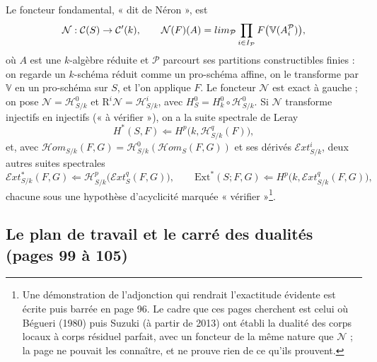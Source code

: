 \documentclass[11pt,a4paper]{article}
\begin{document}
Le foncteur fondamental, « dit de Néron », est
\[
\mathcal{N} : \mathcal{C}(S) \to \mathcal{C}'(k),
\qquad
\mathcal{N}(F)(A) = \varinjlim_{\mathcal{P}} \prod_{i \in I_{\mathcal{P}}}
F\bigl(\mathbb{V}(A^{\mathcal{P}}_i)\bigr),
\]
où $A$ est une $k$-algèbre réduite et $\mathcal{P}$ parcourt ses partitions
constructibles finies : on regarde un $k$-schéma réduit comme un pro-schéma
affine, on le transforme par $\mathbb{V}$ en un pro-schéma sur $S$, et l'on applique
$F$. Le foncteur $\mathcal{N}$ est exact à gauche ; on pose $\mathcal{N} =
\mathcal{H}^0_{S/k}$ et $\mathrm{R}^i\mathcal{N} = \mathcal{H}^i_{S/k}$, avec
$H^0_S = H^0_k \circ \mathcal{H}^0_{S/k}$. Si $\mathcal{N}$ transforme injectifs en
injectifs (« à vérifier »), on a la suite spectrale de Leray
\[
H^{*}(S, F) \Longleftarrow H^p\bigl(k, \mathcal{H}^q_{S/k}(F)\bigr),
\]
et, avec $\mathcal{H}om_{S/k}(F, G) = \mathcal{H}^0_{S/k}(\mathcal{H}om_S(F, G))$ et
ses dérivés $\mathcal{E}xt^i_{S/k}$, deux autres suites spectrales
\[
\mathcal{E}xt^{*}_{S/k}(F, G) \Longleftarrow \mathcal{H}^p_{S/k}\bigl(\mathcal{E}xt^q_S(F,
G)\bigr),
\qquad
\mathrm{Ext}^{*}(S; F, G) \Longleftarrow H^p\bigl(k, \mathcal{E}xt^q_{S/k}(F, G)\bigr),
\]
chacune sous une hypothèse d'acyclicité marquée « vérifier »\footnote{Une
démonstration de l'adjonction qui rendrait l'exactitude évidente est écrite puis
barrée en page 96. Le cadre que ces pages cherchent est celui où Bégueri (1980)
puis Suzuki (à partir de 2013) ont établi la dualité des corps locaux à corps
résiduel parfait, avec un foncteur de la même nature que $\mathcal{N}$ ; la page
ne pouvait les connaître, et ne prouve rien de ce qu'ils prouvent.}.

\subsection*{Le plan de travail et le carré des dualités (pages 99 à 105)}
\end{document}
